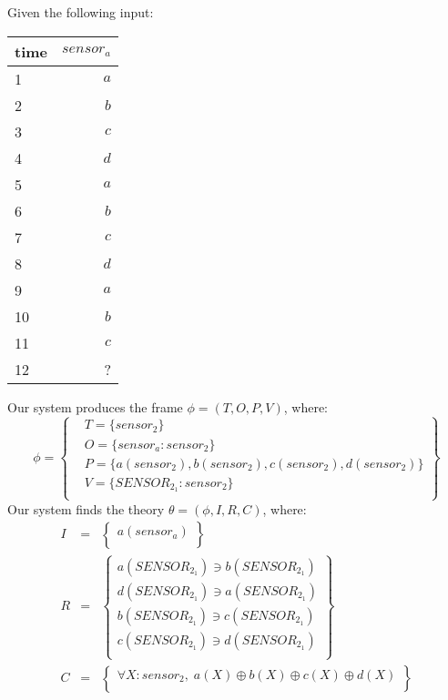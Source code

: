 
Given the following input:
\begin{table}[ht!]
\begin{center}
\begin{tabular}{|l|r|}
\hline
time & $\mathit{sensor}_a$\\
\hline
1 & $\mathit{a}$ \\
2 & $\mathit{b}$ \\
3 & $\mathit{c}$ \\
4 & $\mathit{d}$ \\
5 & $\mathit{a}$ \\
6 & $\mathit{b}$ \\
7 & $\mathit{c}$ \\
8 & $\mathit{d}$ \\
9 & $\mathit{a}$ \\
10 & $\mathit{b}$ \\
11 & $\mathit{c}$ \\
12 & ? \\
\hline
\end{tabular}
\end{center}
\end{table}

Our system produces the frame $\phi = (T, O, P, V)$, where:
\begin{equation*}
\phi = \left \{
\begin{aligned}
& T = \{ 
sensor_2
\}\\
& O = \{
\mathit{sensor}_a: sensor_2
\}\\
& P = \{
\mathit{a}(sensor_2),\mathit{b}(sensor_2),\mathit{c}(sensor_2),\mathit{d}(sensor_2)
\}\\
& V = \{
SENSOR_2_1: sensor_2
\}\\
\end{aligned}\right\}
\end{equation*}
Our system finds the theory $\theta = (\phi, I, R, C)$, where:
\begin{eqnarray*}
I & = & \left\{ \begin{array}{l}
\mathit{a}(\mathit{sensor}_a)\\
\end{array}\right\}\\
R & = &  \left\{ \begin{array}{l}
\mathit{a}(\mathit{SENSOR}_2_1) \ni \mathit{b}(\mathit{SENSOR}_2_1)\\
\mathit{d}(\mathit{SENSOR}_2_1) \ni \mathit{a}(\mathit{SENSOR}_2_1)\\
\mathit{b}(\mathit{SENSOR}_2_1) \ni \mathit{c}(\mathit{SENSOR}_2_1)\\
\mathit{c}(\mathit{SENSOR}_2_1) \ni \mathit{d}(\mathit{SENSOR}_2_1)\\
\end{array}\right\}\\
C & = & \left\{ \begin{array}{l}
\forall X : sensor_2,\;\mathit{a}(X) \oplus \mathit{b}(X) \oplus \mathit{c}(X) \oplus \mathit{d}(X)\\
\end{array}\right\}\\
\end{eqnarray*}

